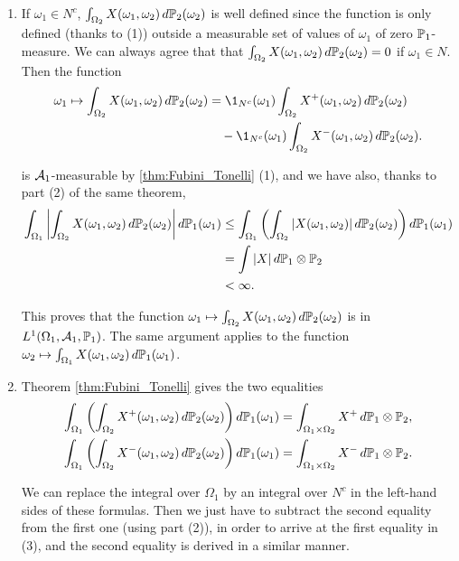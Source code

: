 \documentclass[../Main.tex]{subfiles}
\begin{document}
{\begin{enumerate}
\medskip

\item  If $\omega_1 \in N^c$, $\int_{\Omega_2} X(\omega_1,\omega_2)\,d\mathbb{P}_2(\omega_2)$ is well defined since the function is only defined (thanks to (1)) outside a measurable set of values of $\omega_1$ of zero $\mathbb{P}_1$-measure. We can always agree that that $\int_{\Omega_2} X(\omega_1,\omega_2)\,d\mathbb{P}_2(\omega_2)=0$ if $\omega_1 \in N$. Then the function
\begin{align*}
\omega_1 \mapsto \int_{\Omega_2} X(\omega_1,\omega_2)\,d\PP_2(\omega_2)
&= \1_{N^c}(\omega_1)\int_{\Omega_2} X^+(\omega_1,\omega_2)\,d\PP_2(\omega_2) \\
&\quad - \1_{N^c}(\omega_1)\int_{\Omega_2} X^-(\omega_1,\omega_2)\,d\PP_2(\omega_2).
\end{align*}

is $\mathcal{A}_1$-measurable by \ref{thm:Fubini_Tonelli} (1), and we have also, thanks to part (2) of the same theorem,
\begin{align*}
\int_{\Omega_1} \left| \int_{\Omega_2} X(\omega_1,\omega_2)\,d\mathbb{P}_2(\omega_2) \right| d\mathbb{P}_1(\omega_1)
&\leq \int_{\Omega_1} \left( \int_{\Omega_2} |X(\omega_1,\omega_2)|\,d\mathbb{P}_2(\omega_2) \right)d\mathbb{P}_1(\omega_1) \\
&= \int |X| \, d\mathbb{P}_1 \otimes \mathbb{P}_2 \\
&< \infty.
\end{align*}

This proves that the function $\omega_1 \mapsto \int_{\Omega_2} X(\omega_1,\omega_2)\,d\mathbb{P}_2(\omega_2)$ is in $L^1(\Omega_1,\mathcal{A}_1,\mathbb{P}_1)$.
The same argument applies to the function $\omega_2 \mapsto \int_{\Omega_1} X(\omega_1,\omega_2)\,d\mathbb{P}_1(\omega_1)$.

\medskip

\item Theorem \ref{thm:Fubini_Tonelli} gives the two equalities
\begin{align*}
\int_{\Omega_1} \left( \int_{\Omega_2} X^+(\omega_1,\omega_2)\,d\mathbb{P}_2(\omega_2) \right)d\mathbb{P}_1(\omega_1)
&= \int_{\Omega_1 \times \Omega_2} X^+ \, d\mathbb{P}_1 \otimes \mathbb{P}_2, \\
\int_{\Omega_1} \left( \int_{\Omega_2} X^-(\omega_1,\omega_2)\,d\mathbb{P}_2(\omega_2) \right)d\mathbb{P}_1(\omega_1)
&= \int_{\Omega_1 \times \Omega_2} X^- \, d\mathbb{P}_1 \otimes \mathbb{P}_2.
\end{align*}

We can replace the integral over $\Omega_1$ by an integral over $N^c$ in the left-hand sides
of these formulas. Then we just have to subtract the second equality from the first one
(using part (2)), in order to arrive at the first equality in (3), and the second equality
is derived in a similar manner.
\end{enumerate}
}
\end{document}
